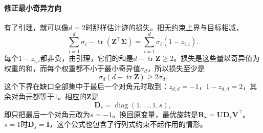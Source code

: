 \paragraph{修正最小奇异方向}
有了引理，就可以像$d=2$时那样估计迹的损失。把无约束上界与目标相减，
\[
 \sum_{i=1}^d\sigma_i-\operatorname{tr}(\bm Z^\top\bm\Sigma)=\sum_{i=1}^d\sigma_i(1-z_{i,i}).
\]
每个$1-z_{i,i}$都非负，由引理，它们的和是$d-\operatorname{tr}\bm Z\geq2$。损失是这些量以奇异值为权重的和，而每个权重都不小于最小奇异值$\sigma_d$，所以损失至少是
\[
 \sigma_d(d-\operatorname{tr}\bm Z)\geq2\sigma_d .
\]
这个下界在缺口全部集中于最后一个对角元时取到：$z_{d,d}=-1$，$1-z_{d,d}=2$，其余对角元都等于$1$。相应的$\bm Z$是
\begin{equation}
 \bm D_s=\operatorname{diag}(1,\ldots,1,s),
 \label{eq:matrix-approximation-rotation-correction}
\end{equation}
即只把最后一个对角元改为$s=-1$。换回原变量，最优旋转是$\bm R_\star=\bm U\bm D_s\bm V^\top$。$s=1$时$\bm D_s=\bm I$，这个公式也包含了行列式约束不起作用的情形。


